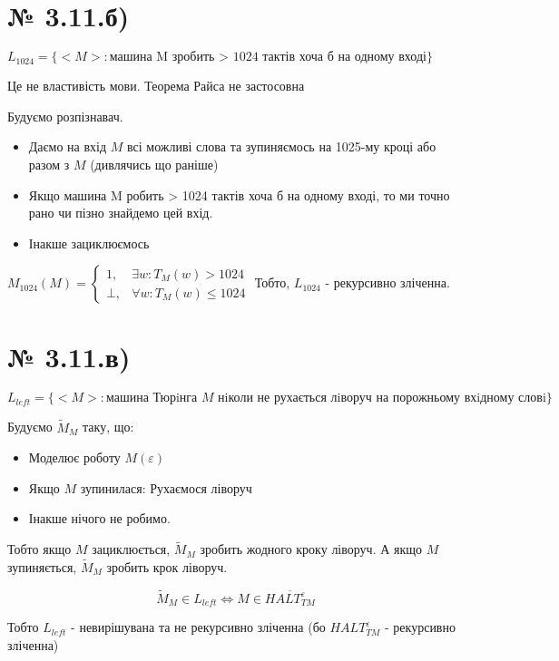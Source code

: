 \documentclass[11pt, a4paper]{article} %
\begin{document}
\section*{№ 3.11.б)}
\begin{mdframed}
    $L_{1024} = \{<M> : \text{машина M зробить > 1024 тактів хоча б на одному вході}\}$
\end{mdframed}

Це не властивість мови. Теорема Райса не застосовна

Будуємо розпізнавач.
\begin{itemize}
    \item Даємо на вхід $M$ всі можливі слова та зупиняємось на 1025-му кроці або разом з $M$ (дивлячись що раніше)
    \item Якщо машина M робить > 1024 тактів хоча б на одному вході, то ми точно рано чи пізно знайдемо цей вхід.
    \item Інакше зациклюємось 
\end{itemize}

$M_{1024}(M) = \begin{cases}
    1,& \exists w: T_M(w) > 1024\\
    \bot, & \forall w: T_M(w) \le 1024
\end{cases}$
Тобто, $L_{1024}$ - рекурсивно зліченна.


\section*{№ 3.11.в)}
\begin{mdframed}
    $L_{left} = \{<M> : \text{машина Тюрiнга 𝑀 нiколи не рухається лiворуч на порожньому вхiдному словi}\}$
\end{mdframed}

Будуємо $\tilde{M}_M$ таку, що:
\begin{itemize}
    \item Моделює роботу $M(\varepsilon)$
    \item Якщо $M$ зупинилася:
    \subitem Рухаємося ліворуч
    \item Інакше нічого не робимо.
\end{itemize}
Тобто якщо $M$ зациклюється, $\tilde{M}_M$ зробить жодного кроку ліворуч.
А якщо $M$ зупиняється, $\tilde{M}_M$ зробить крок ліворуч.

$$\tilde{M}_M \in L_{left} \iff M \in \overline{HALT^\varepsilon_{TM}}$$

Тобто $L_{left}$ - невирішувана та не рекурсивно зліченна (бо $HALT^\varepsilon_{TM}$ - рекурсивно зліченна)
\end{document}
